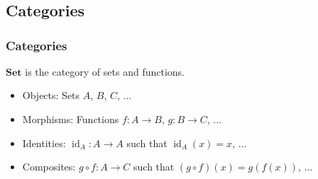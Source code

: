 \documentclass{beamer}
\DeclareMathOperator{\id}{id}
\newcommand{\idO}[1]{\natO{\id}{#1}}
\newcommand{\comp}{\ensuremath{\mathrel{\circ}}}
\newcommand{\catbf}[1]{\ensuremath{\mathbf{#1}}\xspace}
\newcommand{\set}{\catbf{Set}}
\newcommand{\nat}[1]{\ensuremath{#1}}
\newcommand{\natO}[2]{\ensuremath{\nat{#1}_{#2}}}
\begin{document}

\appendix
\section{\appendixname}



\subsection{Categories}


\begin{frame}[label={ex:set}]
  \frametitle{Categories}

  \begin{example}
    \set is the category of sets and functions.
    \begin{itemize}
    \item
      Objects: Sets $A$, $B$, $C$, ...
    \item
      Morphisms: Functions $f: A \to B$, $g: B \to C$, ...
    \item
      Identities: $\idO{A}: A \to A$ such that $\idO{A}(x) = x$, ...
    \item
      Composites: $g \comp f: A \to C$ such that $(g \comp f)(x) =
      g(f(x))$, ...
    \end{itemize}
  \end{example}

\end{frame}

\end{document}
